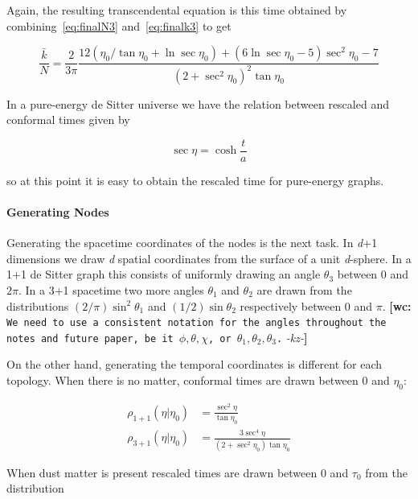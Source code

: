 \documentclass[preprint,notitlepage,amsmath,amssymb,floatfix]{revtex4-1}
\newcommand{\XXX}[3]{{\bf [#1: } {\tt #3} {\it -#2-}{\bf ]}}
\begin{document}
\noindent Again, the resulting transcendental equation is this time obtained by combining~\eqref{eq:finalN3} and~\eqref{eq:finalk3} to get

\begin{equation}
\label{eq:trans3}
\frac{\bar k}{N} = \frac{2}{3\pi}\frac{12\left(\eta_0/\tan\eta_0 + \ln\sec\eta_0\right) + \left(6\ln\sec\eta_0 - 5\right)\sec^2\eta_0 - 7}{\left(2+\sec^2\eta_0\right)^2\tan\eta_0}
\end{equation}

\noindent In a pure-energy de Sitter universe we have the relation between rescaled and conformal times given by 

\begin{equation}
\sec\eta = \cosh\frac{t}{a}
\end{equation}

\noindent so at this point it is easy to obtain the rescaled time for pure-energy graphs.
\paragraph{Generating Nodes}
Generating the spacetime coordinates of the nodes is the next task.  
In \textit{d}+1 dimensions we draw \textit{d} spatial coordinates from the surface of a unit \textit{d}-sphere.  
In a 1+1 de Sitter graph this consists of uniformly drawing an angle $\theta_3$ between 0 and $2\pi$.  
In a 3+1 spacetime two more angles $\theta_1$ and $\theta_2$ are drawn from the distributions $\left(2/\pi\right)\sin^2\theta_1$ and $\left(1/2\right)\sin\theta_2$ respectively between 0 and $\pi$. \XXX{wc}{kz}{We need to use a consistent notation for the angles throughout the notes and future paper, be it $\phi,\theta,\chi$, or $\theta_1,\theta_2,\theta_3$.}\par
On the other hand, generating the temporal coordinates is different for each topology.
When there is no matter, conformal times are drawn between 0 and $\eta_0$:

\begin{equation}
\begin{split}
\rho_{1+1}\left(\eta|\eta_0\right) &= \frac{\sec^2\eta}{\tan\eta_0} \\
\rho_{3+1}\left(\eta|\eta_0\right) &= \frac{3\sec^4\eta}{\left(2+\sec^2\eta_0\right)\tan\eta_0}
\end{split}
\end{equation}

\noindent When dust matter is present rescaled times are drawn between 0 and $\tau_0$ from the distribution
\end{document}
